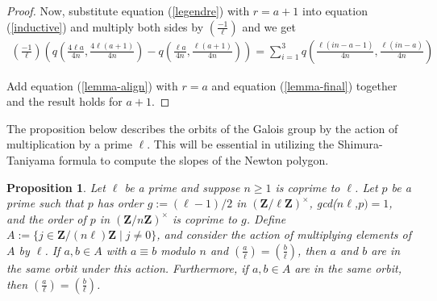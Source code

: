 \documentclass{article}
\newtheorem{proposition}[theorem]{Proposition}
\theoremstyle{remark}
\theoremstyle{definition}
\begin{document}
\begin{proof}
   
    
    \par Now, substitute equation (\ref{legendre}) with $r = a+1$ into equation (\ref{inductive}) and multiply both sides by $\left ( \frac{-1}{\ell}\right)$ and we get \begin{align} \label{lemma-final}
        \left (\frac{-1}{\ell} \right)\left( q\left(\frac{4\ell a}{4n}, \frac{4\ell(a+1)}{4n} \right) - q\left(\frac{\ell a}{4n}, \frac{\ell(a+1)}{4n} \right) \right) = \sum_{i=1}^3 q\left(\frac{\ell(in-a-1)}{4n}, \frac{\ell(in-a)}{4n} \right)
    \end{align}
    
    \par Add equation (\ref{lemma-align}) with $r = a$ and equation (\ref{lemma-final}) together and the result holds for $a+1$.
\end{proof}

\par The proposition below describes the orbits of the Galois group by the action of multiplication by a prime $\ell$. This will be essential in utilizing the Shimura-Taniyama formula to compute the slopes of the Newton polygon.

\begin{proposition}
\label{orbits}
    Let $\ell$ be a prime and suppose $n \geq 1$ is coprime to $\ell$. Let $p$ be a prime such that $p$ has order $g := (\ell-1)/2$ in $(\mathbf{Z}/\ell\mathbf{Z})^\times$, gcd($n\ell$,$p) = 1$, and the order of $p$ in $(\mathbf{Z}/n\mathbf{Z})^\times$ is coprime to $g$. Define $A := \{j \in \mathbf{Z}/(n\ell)\mathbf{Z} \mid j \neq 0\}$, and consider the action of multiplying elements of $A$ by $\ell$. If $a,b \in A$ with $a \equiv b$ modulo $n$ and $\left (\frac{a}{\ell} \right) = \left (\frac{b}{\ell} \right)$, then $a$ and $b$ are in the same orbit under this action. Furthermore, if $a,b \in A$ are in the same orbit, then $\left (\frac{a}{\ell} \right) = \left (\frac{b}{\ell} \right)$.
\end{proposition}
\end{document}
